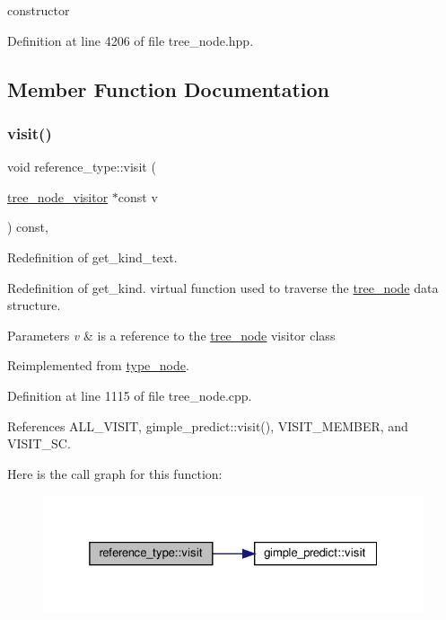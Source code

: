 constructor 



Definition at line 4206 of file tree\+\_\+node.\+hpp.



\subsection{Member Function Documentation}
\mbox{\label{structreference__type_aa5b63ca7df3884098382105ee8c1e128}} 
\subsubsection{\texorpdfstring{visit()}{visit()}}
{\footnotesize\ttfamily void reference\+\_\+type\+::visit (\begin{DoxyParamCaption}\item[{\hyperlink{classtree__node__visitor}{tree\+\_\+node\+\_\+visitor} $\ast$const}]{v }\end{DoxyParamCaption}) const\hspace{0.3cm}{\ttfamily [override]}, {\ttfamily [virtual]}}



Redefinition of get\+\_\+kind\+\_\+text. 

Redefinition of get\+\_\+kind. virtual function used to traverse the \hyperlink{classtree__node}{tree\+\_\+node} data structure. 
\begin{DoxyParams}{Parameters}
{\em v} & is a reference to the \hyperlink{classtree__node}{tree\+\_\+node} visitor class \\
\hline
\end{DoxyParams}


Reimplemented from \hyperlink{structtype__node_adc6e447af5f9505e6305320933c46a96}{type\+\_\+node}.



Definition at line 1115 of file tree\+\_\+node.\+cpp.



References A\+L\+L\+\_\+\+V\+I\+S\+IT, gimple\+\_\+predict\+::visit(), V\+I\+S\+I\+T\+\_\+\+M\+E\+M\+B\+ER, and V\+I\+S\+I\+T\+\_\+\+SC.

Here is the call graph for this function\+:
\nopagebreak
\begin{figure}[H]
\begin{center}
\leavevmode
\includegraphics[width=325pt]{dd/da3/structreference__type_aa5b63ca7df3884098382105ee8c1e128_cgraph}
\end{center}
\end{figure}


